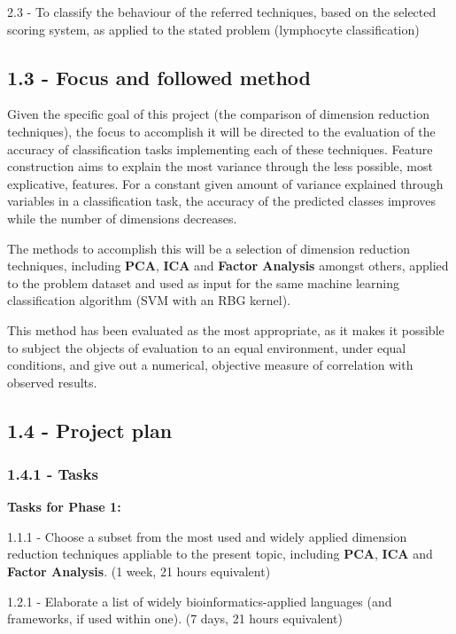 \documentclass[]{article}
\begin{document}
2.3 - To classify the behaviour of the referred techniques, based on the
selected scoring system, as applied to the stated problem (lymphocyte
classification)

\subsection{1.3 - Focus and followed
method}\label{focus-and-followed-method}

Given the specific goal of this project (the comparison of dimension
reduction techniques), the focus to accomplish it will be directed to
the evaluation of the accuracy of classification tasks implementing each
of these techniques. Feature construction aims to explain the most
variance through the less possible, most explicative, features. For a
constant given amount of variance explained through variables in a
classification task, the accuracy of the predicted classes improves
while the number of dimensions decreases.

The methods to accomplish this will be a selection of dimension
reduction techniques, including \textbf{PCA}, \textbf{ICA} and
\textbf{Factor Analysis} amongst others, applied to the problem dataset
and used as input for the same machine learning classification algorithm
(SVM with an RBG kernel).

This method has been evaluated as the most appropriate, as it makes it
possible to subject the objects of evaluation to an equal environment,
under equal conditions, and give out a numerical, objective measure of
correlation with observed results.

\subsection{1.4 - Project plan}\label{project-plan}

\subsubsection{1.4.1 - Tasks}\label{tasks}

\textbf{Tasks for Phase 1:}

1.1.1 - Choose a subset from the most used and widely applied dimension
reduction techniques appliable to the present topic, including
\textbf{PCA}, \textbf{ICA} and \textbf{Factor Analysis}. (1 week, 21
hours equivalent)

1.2.1 - Elaborate a list of widely bioinformatics-applied languages (and
frameworks, if used within one). (7 days, 21 hours equivalent)
\end{document}
